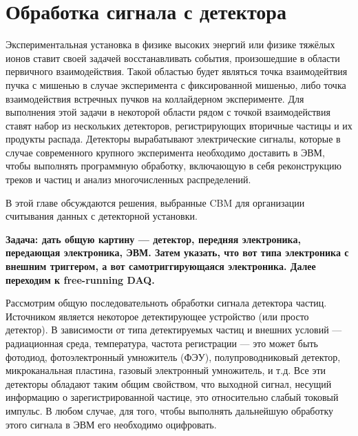 \section{Обработка сигнала с детектора}\label{sec:secSignalProcessing}

Экспериментальная установка в физике высоких энергий или физике тяжёлых ионов ставит своей задачей восстанавливать события, произошедшие в области первичного взаимодействия. Такой областью будет являться точка взаимодейтвия пучка с мишенью в случае эксперимента с фиксированной мишенью, либо точка взаимодействия встречных пучков на коллайдерном эксперименте. Для выполнения этой задачи в некоторой области рядом с точкой взаимодействия ставят набор из нескольких детекторов, регистрирующих вторичные частицы и их продукты распада. Детекторы вырабатывают электрические сигналы, которые в случае современного крупного эксперимента необходимо доставить в ЭВМ, чтобы выполнять программную обработку, включающую в себя реконструкцию треков и частиц и анализ многочисленных распределений.


В этой главе обсуждаются решения, выбранные CBM для организации считывания данных с детекторной установки.

\textbf{Задача: дать общую картину --- детектор, передняя электроника, передающая электроника, ЭВМ. Затем указать, что вот типа электроника с внешним триггером, а вот самотриггирующаяся электроника. Далее переходим к free-running DAQ.}

Рассмотрим общую последовательноть обработки сигнала детектора частиц.
Источником является некоторое детектирующее устройство (или просто детектор). В зависимости от типа детектируемых частиц и внешних условий --- радиационная среда, температура, частота регистрации --- это может быть фотодиод, фотоэлектронный умножитель (ФЭУ), полупроводниковый детектор, микроканальная пластина, газовый электронный умножитель, и т.д. Все эти детекторы обладают таким общим свойством, что выходной сигнал, несущий информацию о зарегистрированной частице, это относительно слабый токовый импульс. В любом случае, для того, чтобы выполнять дальнейшую обработку этого сигнала в ЭВМ его необходимо оцифровать.

